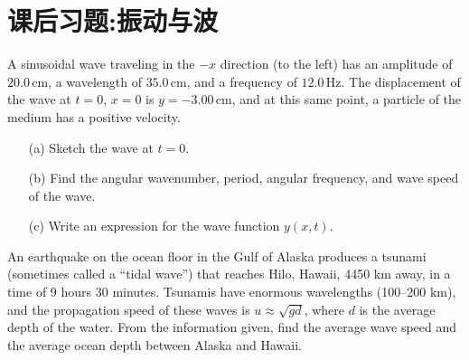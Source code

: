 \section{课后习题:振动与波}

\begin{example}
		A sinusoidal wave traveling in the $-x$ direction (to the left) has an amplitude of $20.0 \, \text{cm}$, a wavelength of $35.0 \, \text{cm}$, and a frequency of $12.0 \, \text{Hz}$. The displacement of the wave at $t = 0$, $x = 0$ is $y = -3.00 \, \text{cm}$, and at this same point, a particle of the medium has a positive velocity.

	\begin{enumerate}
		\item[(a)] Sketch the wave at $t = 0$.
		\item[(b)] Find the angular wavenumber, period, angular frequency, and wave speed of the wave.
		\item[(c)] Write an expression for the wave function $y(x, t)$.
	\end{enumerate}
\end{example}

\begin{example}
	An earthquake on the ocean floor in the Gulf of Alaska produces a tsunami (sometimes called a ``tidal wave'') that reaches Hilo, Hawaii, 4450 km away, in a time of 9 hours 30 minutes. Tsunamis have enormous wavelengths (100--200 km), and the propagation speed of these waves is \( u \approx \sqrt{gd} \), where \( d \) is the average depth of the water. From the information given, find the average wave speed and the average ocean depth between Alaska and Hawaii.
\end{example}

